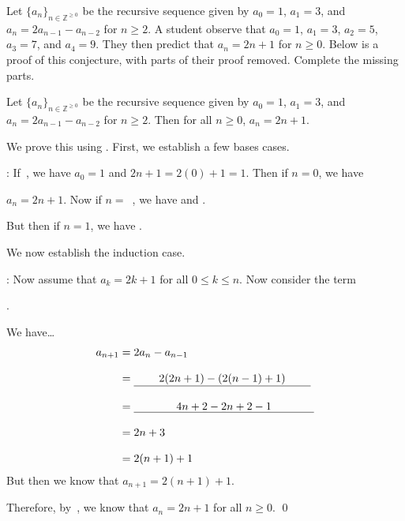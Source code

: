 \documentclass[11pt,letterpaper]{article}
\begin{document}
\newpage



 Let $\{ a_n \}_{n \in \mathbb{Z}^{\geq 0}}$ be the recursive sequence given by $a_0= 1$, $a_1= 3$, and $a_n= 2a_{n - 1}  - a_{n - 2}$ for $n \geq 2$. A student observe that $a_0= 1$, $a_1= 3$, $a_2= 5$, $a_3= 7$, and $a_4= 9$. They then predict that $a_n= 2n + 1$ for $n \geq 0$. Below is a proof of this conjecture, with parts of their proof removed. Complete the missing parts. \pspace

 Let $\{ a_n \}_{n \in \mathbb{Z}^{\geq 0}}$ be the recursive sequence given by $a_0= 1$, $a_1= 3$, and $a_n= 2a_{n - 1}  - a_{n - 2}$ for $n \geq 2$. Then for all $n \geq 0$, $a_n= 2n + 1$. \pspace

 We prove this using . First, we establish a few bases cases. \pspace

: If \,, we have $a_0= 1$ and $2n + 1= 2(0) + 1= 1$. Then if $n= 0$, we have \pspace

$a_n= 2n + 1$. Now if $n=$ \,, we have  and . \pspace

But then if $n= 1$, we have . \pvspace{1cm}

We now establish the induction case. \pspace

: Now assume that $a_k= 2k + 1$ for all $0 \leq k \leq n$. Now consider the term \pspace

. \pspace

We have\dots
	\[
	\begin{aligned}
	a_{n + 1}&= 2a_n - a_{n - 1} \\[0.3cm]
	&= \uans{0.8cm}{2(2n + 1) - (2(n - 1) + 1)} \\[0.3cm]
	&= \uans{1.35cm}{4n + 2 - 2n + 2 - 1} \\[0.3cm]
	&= 2n + 3 \\[0.3cm]
	&= 2(n + 1) + 1
	\end{aligned}
	\] \pspace
But then we know that $a_{n + 1}= 2(n + 1) + 1$. \pspace

Therefore, by \,, we know that $a_n= 2n + 1$ for all $n \geq 0$. \qed
\end{document}
